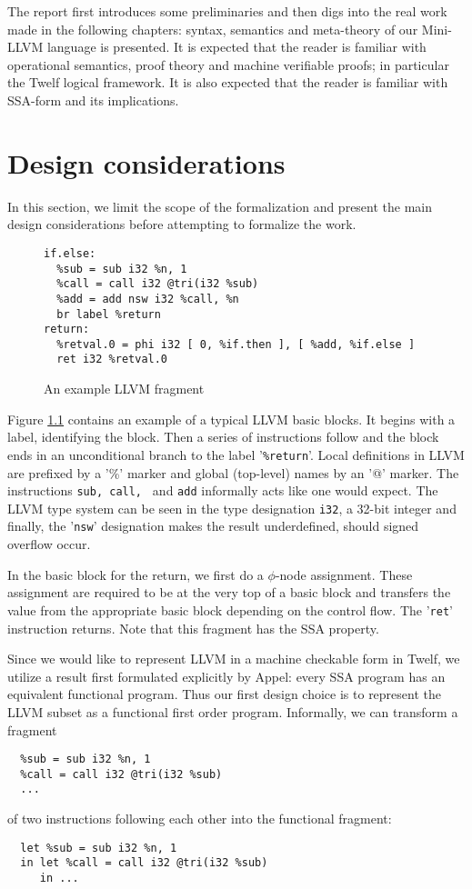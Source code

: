 \documentclass[a4paper, oneside, 10pt, draft]{memoir}
\begin{document}
The report first introduces some preliminaries and then digs into the
real work made in the following chapters: syntax, semantics and
meta-theory of our Mini-LLVM language is presented. It is expected
that the reader is familiar with operational semantics, proof theory
and machine verifiable proofs; in particular the Twelf logical
framework. It is also expected that the reader is familiar with
SSA-form and its implications.

\chapter{Design considerations}

In this section, we limit the scope of the formalization and present
the main design considerations before attempting to formalize the work.

\begin{figure}
\begin{verbatim}
if.else:
  %sub = sub i32 %n, 1
  %call = call i32 @tri(i32 %sub)
  %add = add nsw i32 %call, %n
  br label %return
return:
  %retval.0 = phi i32 [ 0, %if.then ], [ %add, %if.else ]
  ret i32 %retval.0

\end{verbatim}
  \caption{An example LLVM fragment}
  \label{fig:llvm-example-1}
\end{figure}

Figure \ref{fig:llvm-example-1} contains an example of a typical LLVM
basic blocks. It begins with a label, identifying the block. Then a
series of instructions follow and the block ends in an unconditional
branch to the label '\texttt{\%return}'. Local definitions in LLVM are
prefixed by a '\%' marker and global (top-level) names by an '@'
marker. The instructions \texttt{sub, call, } and \texttt{add}
informally acts like one would expect. The LLVM type system can be
seen in the type designation \texttt{i32}, a 32-bit integer and
finally, the '\texttt{nsw}' designation makes the result underdefined,
should signed overflow occur.

In the basic block for the return, we first do a $\phi$-node
assignment. These assignment are required to be at the very top of a
basic block and transfers the value from the appropriate basic block
depending on the control flow. The '\texttt{ret}' instruction
returns. Note that this fragment has the SSA property.

Since we would like to represent LLVM in a machine checkable form in
Twelf, we utilize a result first formulated explicitly by
Appel\cite{appel:1998:modern, appel:1998:ssa}: every SSA program has
an equivalent functional program. Thus our first design choice is to
represent the LLVM subset as a functional first order
program. Informally, we can transform a fragment
\begin{verbatim}
  %sub = sub i32 %n, 1
  %call = call i32 @tri(i32 %sub)
  ...
\end{verbatim}
of two instructions following each other into the functional fragment:
\begin{verbatim}
  let %sub = sub i32 %n, 1
  in let %call = call i32 @tri(i32 %sub)
     in ...
\end{verbatim}
\end{document}
